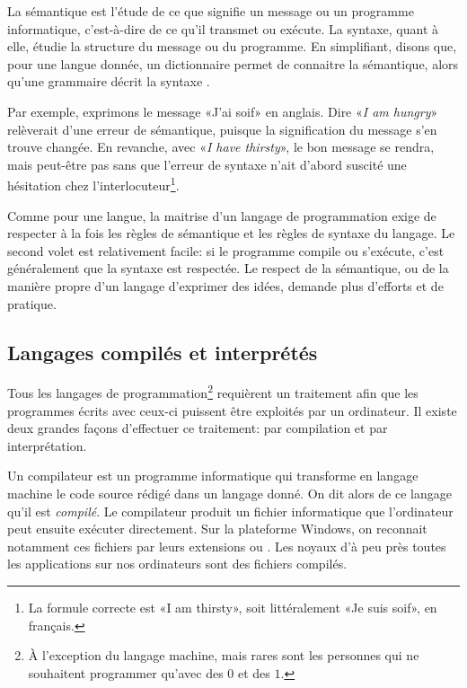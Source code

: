 La sémantique est l'étude de ce que signifie un message ou un
programme informatique, c'est-à-dire de ce qu'il transmet ou exécute.
La syntaxe, quant à elle, étudie la structure du message ou du
programme. En simplifiant, disons que, pour une langue donnée, un
dictionnaire permet de connaitre la sémantique, alors qu'une grammaire
décrit la syntaxe \citep{Hebenstreit:semantique}.

Par exemple, exprimons le message «J'ai soif» en anglais. Dire
«\emph{I am hungry}» relèverait d'une erreur de sémantique, puisque la
signification du message s'en trouve changée. En revanche, avec
«\emph{I have thirsty}», le bon message se rendra, mais peut-être pas
sans que l'erreur de syntaxe n'ait d'abord suscité une hésitation chez
l'interlocuteur\footnote{%
  La formule correcte est «I am thirsty», soit littéralement «Je suis
  soif», en français.}.

Comme pour une langue, la maitrise d'un langage de programmation exige
de respecter à la fois les règles de sémantique et les règles de
syntaxe du langage. Le second volet est relativement facile: si le
programme compile ou s'exécute, c'est généralement que la syntaxe est
respectée. Le respect de la sémantique, ou de la manière propre d'un
langage d'exprimer des idées, demande plus d'efforts et de pratique.


\subsection{Langages compilés et interprétés}
\label{sec:informatique:concepts:compile_vs_interprete}

Tous les langages de programmation\footnote{%
  À l'exception du langage machine, mais rares sont les personnes qui
  ne souhaitent programmer qu'avec des $0$ et des $1$.} %
requièrent un traitement afin que les programmes écrits avec ceux-ci
puissent être exploités par un ordinateur. Il existe deux grandes
façons d'effectuer ce traitement: par compilation et par
interprétation.

Un compilateur est un programme informatique qui
transforme en langage machine le code source rédigé dans un langage
donné. On dit alors de ce langage qu'il est \emph{compilé}. Le compilateur produit un fichier
informatique que l'ordinateur peut ensuite exécuter directement. Sur
la plateforme Windows, on reconnait notamment ces fichiers par leurs
extensions  ou . Les noyaux d'à peu près toutes
les applications sur nos ordinateurs sont des fichiers compilés.

